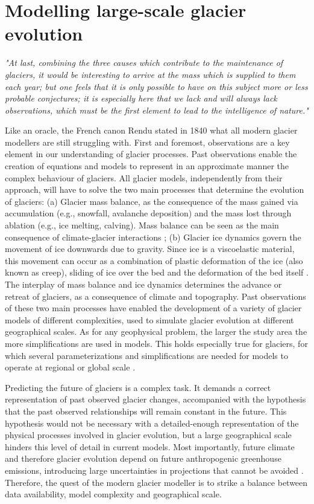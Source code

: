 \section{Modelling large-scale glacier evolution}

\emph{"At last, combining the three causes which contribute to the maintenance of glaciers, it would be interesting to arrive at the mass which is supplied to them each year; but one feels that it is only possible to have on this subject more or less probable conjectures; it is especially here that we lack and will always lack observations, which must be the first element to lead to the intelligence of nature."}

Like an oracle, the French canon Rendu stated in 1840 what all modern glacier modellers are still struggling with. First and foremost, observations are a key element in our understanding of glacier processes. Past observations enable the creation of equations and models to represent in an approximate manner the complex behaviour of glaciers. All glacier models, independently from their approach, will have to solve the two main processes that determine the evolution of glaciers: (a) Glacier mass balance, as the consequence of the mass gained via accumulation (e.g., snowfall, avalanche deposition) and the mass lost through ablation (e.g., ice melting, calving). Mass balance can be seen as the main consequence of climate-glacier interactions \citep{benn_glaciers_2014}; (b) Glacier ice dynamics govern the movement of ice downwards due to gravity. Since ice is a viscoelastic material, this movement can occur as a combination of plastic deformation of the ice (also known as creep), sliding of ice over the bed and the deformation of the bed itself \citep{cuffey_physics_2010}. The interplay of mass balance and ice dynamics determines the advance or retreat of glaciers, as a consequence of climate and topography. Past observations of these two main processes have enabled the development of a variety of glacier models of different complexities, used to simulate glacier evolution at different geographical scales. As for any geophysical problem, the larger the study area the more simplifications are used in models. This holds especially true for glaciers, for which several parameterizations and simplifications are needed for models to operate at regional or global scale \citep[e.g.,][]{marzeion_past_2012, huss_new_2015, maussion_open_2019}. 

Predicting the future of glaciers is a complex task. It demands a correct representation of past observed glacier changes, accompanied with the hypothesis that the past observed relationships will remain constant in the future. This hypothesis would not be necessary with a detailed-enough representation of the physical processes involved in glacier evolution, but a large geographical scale hinders this level of detail in current models. Most importantly, future climate and therefore glacier evolution depend on future anthropogenic greenhouse emissions, introducing large uncertainties in projections that cannot be avoided \citep{marzeion_partitioning_2020}. Therefore, the quest of the modern glacier modeller is to strike a balance between data availability, model complexity and geographical scale.

